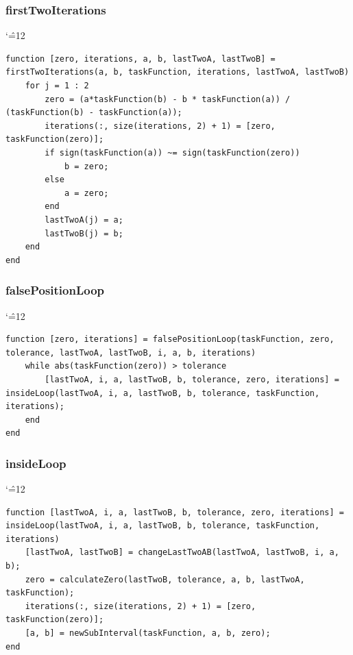 \documentclass[12pt]{report}
\newenvironment{simplechar}{%
   \catcode`\^=12
}{}
\begin{document}
\subsubsection{firstTwoIterations}
\begin{simplechar}
\begin{lstlisting}
function [zero, iterations, a, b, lastTwoA, lastTwoB] = firstTwoIterations(a, b, taskFunction, iterations, lastTwoA, lastTwoB)
    for j = 1 : 2
        zero = (a*taskFunction(b) - b * taskFunction(a)) / (taskFunction(b) - taskFunction(a));
        iterations(:, size(iterations, 2) + 1) = [zero, taskFunction(zero)];
        if sign(taskFunction(a)) ~= sign(taskFunction(zero))
            b = zero;
        else
            a = zero;
        end
        lastTwoA(j) = a;
        lastTwoB(j) = b;
    end
end
\end{lstlisting}
\end{simplechar}

\subsubsection{falsePositionLoop}
\begin{simplechar}
\begin{lstlisting}
function [zero, iterations] = falsePositionLoop(taskFunction, zero, tolerance, lastTwoA, lastTwoB, i, a, b, iterations)
    while abs(taskFunction(zero)) > tolerance
        [lastTwoA, i, a, lastTwoB, b, tolerance, zero, iterations] = insideLoop(lastTwoA, i, a, lastTwoB, b, tolerance, taskFunction, iterations);
    end
end
\end{lstlisting}
\end{simplechar}

\newpage
\subsubsection{insideLoop}
\begin{simplechar}
\begin{lstlisting}
function [lastTwoA, i, a, lastTwoB, b, tolerance, zero, iterations] = insideLoop(lastTwoA, i, a, lastTwoB, b, tolerance, taskFunction, iterations)
    [lastTwoA, lastTwoB] = changeLastTwoAB(lastTwoA, lastTwoB, i, a, b);
    zero = calculateZero(lastTwoB, tolerance, a, b, lastTwoA, taskFunction);
    iterations(:, size(iterations, 2) + 1) = [zero, taskFunction(zero)];
    [a, b] = newSubInterval(taskFunction, a, b, zero);
end
\end{lstlisting}
\end{simplechar}
\end{document}
